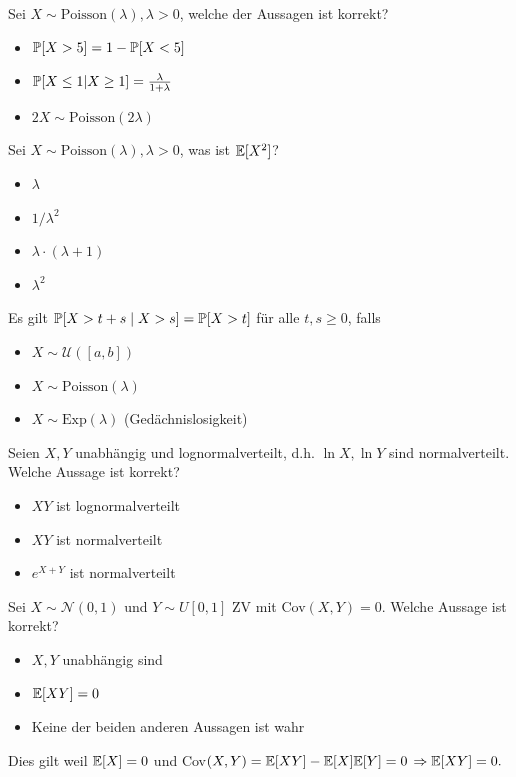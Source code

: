 \hrulefill

Sei $X \sim \text{Poisson}(\lambda), \lambda > 0$, welche der Aussagen ist korrekt?
\begin{itemize}
	\item[$\square$] $\mathbb{P}[X > 5] = 1 - \mathbb{P}[X < 5]$
	\item[\marked] $\mathbb{P}[X \leq 1 | X \geq 1] = \frac{\lambda}{1 + \lambda}$
	\item[$\square$] $2X \sim \text{Poisson}(2\lambda)$
\end{itemize}

\hrulefill

Sei $X \sim \text{Poisson}(\lambda), \lambda > 0$, was ist $\mathbb{E}[X^2]$?
\begin{itemize}
	\item[$\square$] $\lambda$
	\item[$\square$] $1 / \lambda^2$
	\item[\marked] $\lambda \cdot (\lambda + 1)$
	\item[$\square$] $\lambda^2$
\end{itemize}

\hrulefill

Es gilt $\mathbb{P}[X > t + s \; | \; X > s] = \mathbb{P}[X > t]$ für alle $t,s \geq 0$, falls
\begin{itemize}
	\item[$\square$] $X \sim \mathcal{U}([a,b])$
	\item[$\square$] $X \sim \text{Poisson}(\lambda)$
	\item[\marked] $X \sim \text{Exp}(\lambda)$ (Gedächnislosigkeit)
\end{itemize}

\hrulefill

Seien $X, Y$ unabhängig und lognormalverteilt, d.h. $\ln X, \ln Y$ sind normalverteilt. Welche Aussage ist korrekt?
\begin{itemize}
	\item[\marked] $XY$ ist lognormalverteilt
	\item[$\square$] $XY$ ist normalverteilt
	\item[$\square$] $e^{X + Y}$ ist normalverteilt
\end{itemize}

\hrulefill

Sei $X \sim \mathcal{N}(0,1)$ und $Y \sim U[0,1]$ ZV mit Cov$(X,Y) = 0$. Welche Aussage ist korrekt?
\begin{itemize}
	\item[$\square$] $X, Y$ unabhängig sind
	\item[\marked] $\mathbb{E}[XY] = 0$
	\item[$\square$] Keine der beiden anderen Aussagen ist wahr
\end{itemize}
Dies gilt weil $\mathbb{E}[X] = 0$ und Cov$(X,Y) = \mathbb{E}[XY] - \mathbb{E}[X] \mathbb{E}[Y] = 0$ $\Rightarrow \mathbb{E}[XY] = 0.$

